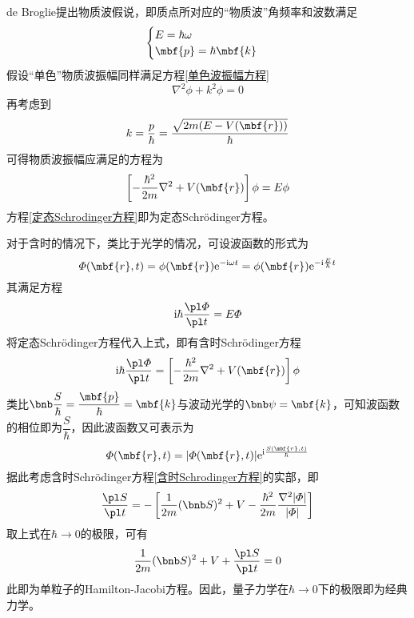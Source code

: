 de Broglie提出物质波假说，即质点所对应的“物质波”角频率和波数满足
\begin{equation}
\begin{cases}
	E = \hbar \omega \\
	\mbf{p} = \hbar \mbf{k}
\end{cases}
\end{equation}
假设“单色”物质波振幅同样满足方程\eqref{单色波振幅方程}
\begin{equation*}
	\nabla^2 \phi + k^2 \phi = 0
\end{equation*}
再考虑到
\begin{equation*}
	k = \frac{p}{\hbar} = \frac{\sqrt{2m(E-V(\mbf{r}))}}{\hbar}
\end{equation*}
可得物质波振幅应满足的方程为
\begin{equation}
	\left[-\frac{\hbar^2}{2m} \nabla^2 + V(\mbf{r})\right] \phi = E\phi
	\label{定态Schrodinger方程}
\end{equation}
方程\eqref{定态Schrodinger方程}即为{\heiti 定态Schr\"{o}dinger方程}。

对于含时的情况下，类比于光学的情况，可设波函数的形式为
\begin{equation*}
	\varPhi(\mbf{r},t) = \phi(\mbf{r}) \mathrm{e}^{-\mathrm{i} \omega t} = \phi(\mbf{r}) \mathrm{e}^{-\mathrm{i} \frac{E}{\hbar} t}
\end{equation*}
其满足方程
\begin{equation}
	\mathrm{i}\hbar \frac{\pl \varPhi}{\pl t} = E\varPhi
\end{equation}
将定态Schr\"{o}dinger方程代入上式，即有{\heiti 含时Schr\"{o}dinger方程}
\begin{equation}
	\mathrm{i}\hbar \frac{\pl \varPhi}{\pl t} = \left[-\frac{\hbar^2}{2m} \nabla^2 + V(\mbf{r})\right] \phi
	\label{含时Schrodinger方程}
\end{equation}
类比$\bnb \dfrac{S}{\hbar} = \dfrac{\mbf{p}}{\hbar} = \mbf{k}$与波动光学的$\bnb \psi = \mbf{k}$，可知波函数的相位即为$\dfrac{S}{\hbar}$，因此波函数又可表示为
\begin{equation*}
	\varPhi(\mbf{r},t) = |\varPhi(\mbf{r},t)| \mathrm{e}^{\mathrm{i}\frac{S(\mbf{r},t)}{\hbar}}
\end{equation*}
据此考虑含时Schr\"{o}dinger方程\eqref{含时Schrodinger方程}的实部，即
\begin{equation*}
	\frac{\pl S}{\pl t} = -\left[\frac{1}{2m} (\bnb S)^2 + V - \frac{\hbar^2}{2m} \frac{\nabla^2 |\varPhi|}{|\varPhi|}\right]
\end{equation*}
取上式在$\hbar \to 0$的极限，可有
\begin{equation*}
	\frac{1}{2m} (\bnb S)^2 + V + \frac{\pl S}{\pl t} = 0
\end{equation*}
此即为单粒子的Hamilton-Jacobi方程。因此，量子力学在$\hbar \to 0$下的极限即为经典力学。

